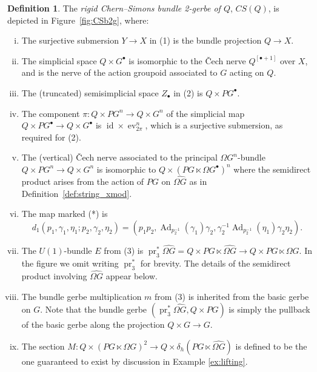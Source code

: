 \documentclass[12pt]{amsart}
\DeclareMathOperator{\id}{id}
\DeclareMathOperator{\Ad}{Ad}
\DeclareMathOperator{\pr}{pr}
\DeclareMathOperator{\ev}{ev}
\theoremstyle{plain}
\theoremstyle{definition}
\newtheorem{definition}[theorem]{Definition}
\theoremstyle{remark}
\numberwithin{equation}{section}
\newcommand{\<}{\langle}
\renewcommand{\>}{\rangle}
\newcommand{\Omegahat}[1]{\widehat{\Omega #1}}
\begin{document}
\begin{definition}\label{def:CS_b2g}
The \emph{rigid Chern--Simons bundle 2-gerbe of $Q$}, $CS(Q)$, is depicted in Figure~\ref{fig:CSb2g}, where:
\begin{enumerate}[(i)]
  \item The surjective submersion $Y\to X$ in (1) is the bundle projection $Q\to X$.
  \item The simplicial space $Q\times G^\bullet$ is isomorphic to the \v{C}ech nerve $Q^{[\bullet+1]}$ over $X$, and is the nerve of the action groupoid associated to $G$ acting on $Q$.
  \item The (truncated) semisimplicial space $Z_\bullet$ in (2) is $Q\times PG^\bullet$.
  \item The component $\pi\colon Q\times PG^n\to Q\times G^n$ of the simplicial map $Q\times PG^\bullet\to Q\times G^\bullet$ is $\id\times \ev^n_{2\pi}$, which is a surjective submersion, as required for (2).
  \item The (vertical) \v{C}ech nerve associated to the principal $\Omega G^n$-bundle $Q\times PG^n\to Q\times G^n$ is isomorphic to $Q\times (PG\ltimes \Omega G^\bullet)^n$ where the semidirect product arises from the action of $PG$ on $\widehat{\Omega G}$ as in Definition~\ref{def:string_xmod}.
  \item The map marked (*) is 
  \[
    d_1(p_1,\gamma_1,\eta_1;p_2,\gamma_2,\eta_2) = (p_1p_2,\Ad_{p_2^{-1}}(\gamma_1)\gamma_2,\gamma_2^{-1}\Ad_{p_2^{-1}}(\eta_1)\gamma_2\eta_2).
  \]
  \item The $U(1)$-bundle $E$ from (3) is $\pr_3^*\widehat{\Omega G} = Q\times PG \ltimes \widehat{\Omega G} \to Q\times PG \ltimes \Omega G$.
  In the figure we omit writing $\pr_3^*$ for brevity. 
  The details of the semidirect product involving $\widehat{\Omega G}$ appear below.
  \item The bundle gerbe multiplication $m$ from (3) is inherited from the basic gerbe on $G$. 
  Note that the bundle gerbe $(\pr_3^*\widehat{\Omega G},Q\times PG)$ is simply the pullback of the basic gerbe along the projection $Q\times G\to G$.
  \item The section $M\colon Q\times (PG\ltimes \Omega G)^2 \to Q\times \delta_h(PG\ltimes \Omegahat{G})$ is defined to be the one guaranteed to exist by discussion in Example \ref{ex:lifting}.

\end{enumerate}

\end{definition}
\end{document}
